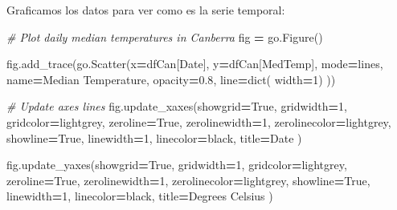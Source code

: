 \documentclass[
  a4paper,
  DIV=11,
  numbers=noendperiod]{scrreprt}
\newenvironment{Shaded}{\begin{snugshade}}{\end{snugshade}}
\newcommand{\BuiltInTok}[1]{#1}
\newcommand{\CommentTok}[1]{\textcolor[rgb]{0.56,0.35,0.01}{\textit{#1}}}
\newcommand{\DecValTok}[1]{\textcolor[rgb]{0.00,0.00,0.81}{#1}}
\newcommand{\FloatTok}[1]{\textcolor[rgb]{0.00,0.00,0.81}{#1}}
\newcommand{\NormalTok}[1]{#1}
\newcommand{\OperatorTok}[1]{\textcolor[rgb]{0.81,0.36,0.00}{\textbf{#1}}}
\newcommand{\StringTok}[1]{\textcolor[rgb]{0.31,0.60,0.02}{#1}}
\newcommand{\VariableTok}[1]{\textcolor[rgb]{0.00,0.00,0.00}{#1}}
\begin{document}
Graficamos los datos para ver como es la serie temporal:

\begin{Shaded}
\begin{Highlighting}[numbers=left,,]
\CommentTok{\# Plot daily median temperatures in Canberra}
\NormalTok{fig }\OperatorTok{=}\NormalTok{ go.Figure()}


\NormalTok{fig.add\_trace(go.Scatter(x}\OperatorTok{=}\NormalTok{dfCan[}\StringTok{\textquotesingle{}Date\textquotesingle{}}\NormalTok{],}
\NormalTok{                         y}\OperatorTok{=}\NormalTok{dfCan[}\StringTok{\textquotesingle{}MedTemp\textquotesingle{}}\NormalTok{],}
\NormalTok{                         mode}\OperatorTok{=}\StringTok{\textquotesingle{}lines\textquotesingle{}}\NormalTok{,}
\NormalTok{                         name}\OperatorTok{=}\StringTok{\textquotesingle{}Median Temperature\textquotesingle{}}\NormalTok{,}
\NormalTok{                         opacity}\OperatorTok{=}\FloatTok{0.8}\NormalTok{,}
\NormalTok{                         line}\OperatorTok{=}\BuiltInTok{dict}\NormalTok{( width}\OperatorTok{=}\DecValTok{1}\NormalTok{)}
\NormalTok{                        ))}

\CommentTok{\# Update axes lines}
\NormalTok{fig.update\_xaxes(showgrid}\OperatorTok{=}\VariableTok{True}\NormalTok{, gridwidth}\OperatorTok{=}\DecValTok{1}\NormalTok{, gridcolor}\OperatorTok{=}\StringTok{\textquotesingle{}lightgrey\textquotesingle{}}\NormalTok{,}
\NormalTok{                 zeroline}\OperatorTok{=}\VariableTok{True}\NormalTok{, zerolinewidth}\OperatorTok{=}\DecValTok{1}\NormalTok{, zerolinecolor}\OperatorTok{=}\StringTok{\textquotesingle{}lightgrey\textquotesingle{}}\NormalTok{,}
\NormalTok{                 showline}\OperatorTok{=}\VariableTok{True}\NormalTok{, linewidth}\OperatorTok{=}\DecValTok{1}\NormalTok{, linecolor}\OperatorTok{=}\StringTok{\textquotesingle{}black\textquotesingle{}}\NormalTok{,}
\NormalTok{                 title}\OperatorTok{=}\StringTok{\textquotesingle{}Date\textquotesingle{}}
\NormalTok{                )}

\NormalTok{fig.update\_yaxes(showgrid}\OperatorTok{=}\VariableTok{True}\NormalTok{, gridwidth}\OperatorTok{=}\DecValTok{1}\NormalTok{, gridcolor}\OperatorTok{=}\StringTok{\textquotesingle{}lightgrey\textquotesingle{}}\NormalTok{,}
\NormalTok{                 zeroline}\OperatorTok{=}\VariableTok{True}\NormalTok{, zerolinewidth}\OperatorTok{=}\DecValTok{1}\NormalTok{, zerolinecolor}\OperatorTok{=}\StringTok{\textquotesingle{}lightgrey\textquotesingle{}}\NormalTok{,}
\NormalTok{                 showline}\OperatorTok{=}\VariableTok{True}\NormalTok{, linewidth}\OperatorTok{=}\DecValTok{1}\NormalTok{, linecolor}\OperatorTok{=}\StringTok{\textquotesingle{}black\textquotesingle{}}\NormalTok{,}
\NormalTok{                 title}\OperatorTok{=}\StringTok{\textquotesingle{}Degrees Celsius\textquotesingle{}}
\NormalTok{                )}


\end{Highlighting}
\end{Shaded}
\end{document}
